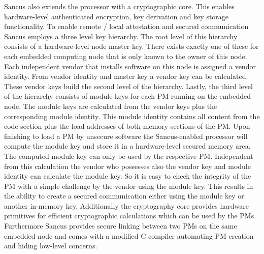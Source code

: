 Sancus also extends the processor with a cryptographic core. This enables
hardware-level authenticated encryption, key derivation and key storage
functionality. To enable remote / local attestation and secured communication
Sancus employs a three level key hierarchy. The root level of this hierarchy
consists of a hardware-level node master key. There exists exactly one of these
for each embedded computing node that is only known to the owner of this node. Each independent vendor that installs software on this node is assigned a vendor identity. From vendor identity and master key a vendor key can be calculated. These vendor keys build the second level of the hierarchy. Lastly, the third level of the hierarchy consists of module keys for each PM running on the embedded node. The module keys are calculated from the vendor keys plus the corresponding module identity. This module identity contains all content from the code section plus the load addresses of both memory sections of the PM\@. Upon finishing to load a PM by unsecure software the Sancus-enabled processor will compute the module key and store it in a hardware-level secured memory area. The computed module key can only be used by the respective PM\@. Independent from this calculation the vendor who possesses also the vendor key and module identity can calculate the module key. So it is easy to check the integrity of the PM with a simple challenge by the vendor using the module key. This results in the ability to create a secured communication either using the module key or another in-memory key. Additionally the cryptography core provides hardware primitives for efficient cryptographic calculations which can be used by the PMs. Furthermore Sancus provides secure linking between two PMs on the same embedded node and comes with a modified C compiler automating PM creation and hiding low-level concerns.